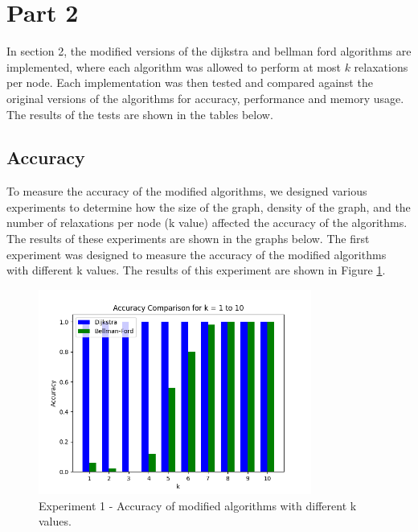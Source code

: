 \documentclass[12pt]{article}
\begin{document}
\section*{Part 2}
In section 2, the modified versions of the dijkstra and bellman ford algorithms are implemented, where each algorithm was allowed to perform at most $k$ relaxations per node. Each implementation
was then tested and compared against the original versions of the algorithms for accuracy, performance and memory usage. The results of the tests are shown in the tables below.

\subsection*{Accuracy}

To measure the accuracy of the modified algorithms, we designed various experiments to determine how the size of the graph, density of the graph, and the number of relaxations per node (k value) 
affected the accuracy of the algorithms. The results of these experiments are shown in the graphs below. 
\smallskip
\newline
\indent The first experiment was designed to measure the accuracy of the modified algorithms with different k values. 
The results of this experiment are shown in Figure \ref{fig:Figure 1}.


\begin{figure}[H]
    \centering
    \includegraphics[width=0.8\textwidth]{Figures/Accuracy_kvals.png} 
    \caption{\footnotesize Experiment 1 - Accuracy of modified algorithms with different k values.}
    \label{fig:Figure 1} 
\end{figure}
\end{document}

